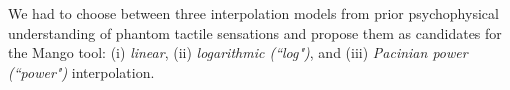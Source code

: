 We had to choose between three interpolation models from prior psychophysical understanding of phantom tactile sensations \cite{Alles1970} and propose them as candidates for the Mango tool:
(i) {\it linear}, 
(ii) {\it logarithmic (``log")}, and 
(iii) {\it Pacinian power (``power")} interpolation. 
%
%

